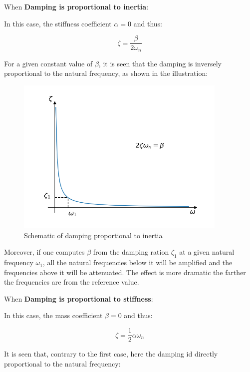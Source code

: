 \documentclass[10pt,b5paper,titlepage]{book}
\begin{document}
When \textbf{Damping is proportional to inertia}:

In this case, the stiffness coefficient $ \alpha = 0 $ and thus:

\begin{equation}
    \zeta = \frac{\beta}{2 \omega_n}
\end{equation}

For a given constant value of $ \beta $, it is seen that the damping is inversely
proportional to the natural frequency, as shown in the illustration:

\begin{figure}[ht]
    \centering
    \includegraphics[width=0.90\textwidth]{img/inertia_dependent_damping.png}
    \caption{Schematic of damping proportional to inertia}
    \label{fig:inertia-dependent-damping-png}
\end{figure}

Moreover, if one computes $ \beta $ from the damping ration $ \zeta_1 $ at a given
natural frequency $ \omega_1 $, all the natural frequencies below it will be amplified
and the frequencies above it will be attenuated. The effect is more dramatic the farther
the frequencies are from the reference value.

When \textbf{Damping is proportional to stiffness}:

In this case, the mass coefficient $ \beta = 0 $ and thus:

\begin{equation}
    \zeta = \frac{1}{2} \alpha \omega_n
\end{equation}

It is seen that, contrary to the first case, here the damping id directly proportional
to the natural frequency:
\end{document}
